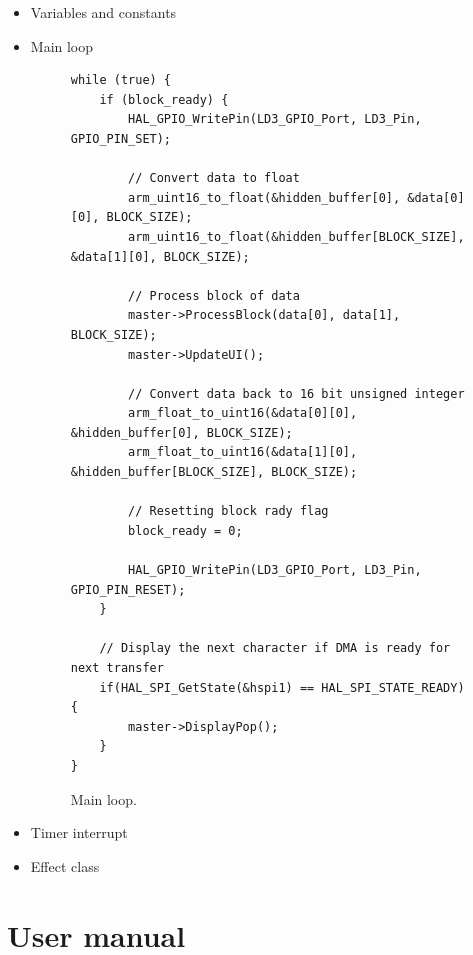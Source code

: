 \documentclass[a4paper,twoside,12pt]{book}
\begin{document}
\begin{itemize}
    \item Variables and constants
    \item Main loop
    \begin{figure}[H]
    \centering
    \begin{lstlisting}
while (true) {
    if (block_ready) {
        HAL_GPIO_WritePin(LD3_GPIO_Port, LD3_Pin, GPIO_PIN_SET);

        // Convert data to float
        arm_uint16_to_float(&hidden_buffer[0], &data[0][0], BLOCK_SIZE);
        arm_uint16_to_float(&hidden_buffer[BLOCK_SIZE], &data[1][0], BLOCK_SIZE);

        // Process block of data
        master->ProcessBlock(data[0], data[1], BLOCK_SIZE);
        master->UpdateUI();

        // Convert data back to 16 bit unsigned integer
        arm_float_to_uint16(&data[0][0], &hidden_buffer[0], BLOCK_SIZE);
        arm_float_to_uint16(&data[1][0], &hidden_buffer[BLOCK_SIZE], BLOCK_SIZE);

        // Resetting block rady flag
        block_ready = 0;

        HAL_GPIO_WritePin(LD3_GPIO_Port, LD3_Pin, GPIO_PIN_RESET);
    }

    // Display the next character if DMA is ready for next transfer
    if(HAL_SPI_GetState(&hspi1) == HAL_SPI_STATE_READY){
        master->DisplayPop();
    }
}
    \end{lstlisting}
    \caption{Main loop.}
    \label{fig:loop}
    \end{figure}

    \item Timer interrupt
    \item Effect class
\end{itemize}


\section{User manual}
\end{document}

